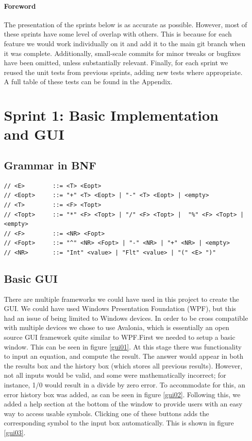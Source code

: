 \documentclass[a4paper, oneside, 11pt]{report}
\begin{document}

    \paragraph{Foreword} The presentation of the sprints below is as accurate as possible. However, most of these sprints have some level of overlap with others. This is because for each feature we would work individually on it and add it to the main git branch when it was complete. Additionally, small-scale commits for minor tweaks or bugfixes have been omitted, unless substantially relevant. Finally, for each sprint we reused the unit tests from previous sprints, adding new tests where appropriate. A full table of these tests can be found in the Appendix.


    \section{Sprint 1: Basic Implementation and GUI}
    \subsection{Grammar in BNF}
    \begin{verbatim}
// <E>        ::= <T> <Eopt>
// <Eopt>     ::= "+" <T> <Eopt> | "-" <T> <Eopt> | <empty>
// <T>        ::= <F> <Topt>
// <Topt>     ::= "*" <F> <Topt> | "/" <F> <Topt> |  "%" <F> <Topt> |<empty>
// <F>        ::= <NR> <Fopt>
// <Fopt>     ::= "^" <NR> <Fopt> | "-" <NR> | "+" <NR> | <empty>
// <NR>       ::= "Int" <value> | "Flt" <value> | "(" <E> ")"
    \end{verbatim}

    \subsection{Basic GUI}
    There are multiple frameworks we could have used in this project to create the GUI. We could have used Windows Presentation Foundation (WPF), but this had an issue of being limited to Windows devices. In order to be cross compatible with multiple devices we chose to use Avalonia, which is essentially an open source GUI framework quite similar to WPF.\newline First we needed to setup a basic window. This can be seen in figure \ref{gui01}. At this stage there was functionality to input an equation, and compute the result. The answer would appear in both the results box and the history box (which stores all previous results). However, not all inputs would be valid, and some were mathematically incorrect; for instance, 1/0 would result in a divide by zero error. To accommodate for this, an error history box was added, as can be seen in figure \ref{gui02}. Following this, we added a help section at the bottom of the window to provide users with an easy way to access usable symbols. Clicking one of these buttons adds the corresponding symbol to the input box automatically. This is shown in figure \ref{gui03}.
\end{document}

